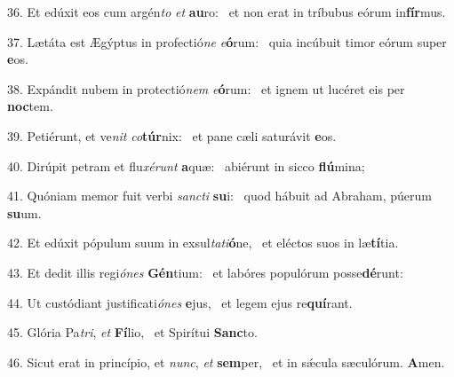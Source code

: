 36. Et edúxit eos cum argén\textit{to} \textit{et} \textbf{au}ro: \ast\  et non erat in tríbubus eórum in\textbf{fír}mus.\

37. Lætáta est Ægýptus in profectió\textit{ne} \textit{e}\textbf{ó}rum: \ast\  quia incúbuit timor eórum super \textbf{e}os.\

38. Expándit nubem in protectió\textit{nem} \textit{e}\textbf{ó}rum: \ast\  et ignem ut lucéret eis per \textbf{noc}tem.\

39. Petiérunt, et ve\textit{nit} \textit{co}\textbf{túr}nix: \ast\  et pane cæli saturávit \textbf{e}os.\

40. Dirúpit petram et flu\textit{xé}\textit{runt} \textbf{a}quæ: \ast\  abiérunt in sicco \textbf{flú}mina;\

41. Quóniam memor fuit verbi \textit{sanc}\textit{ti} \textbf{su}i: \ast\  quod hábuit ad Abraham, púerum \textbf{su}um.\

42. Et edúxit pópulum suum in exsul\textit{ta}\textit{ti}\textbf{ó}ne, \ast\  et eléctos suos in læ\textbf{tí}tia.\

43. Et dedit illis regi\textit{ó}\textit{nes} \textbf{Gén}tium: \ast\  et labóres populórum posse\textbf{dé}runt:\

44. Ut custódiant justificati\textit{ó}\textit{nes} \textbf{e}jus, \ast\  et legem ejus re\textbf{quí}rant.\

45. Glória Pa\textit{tri}, \textit{et} \textbf{Fí}lio, \ast\  et Spirítui \textbf{Sanc}to.\

46. Sicut erat in princípio, et \textit{nunc}, \textit{et} \textbf{sem}per, \ast\  et in sǽcula sæculórum. \textbf{A}men.\


